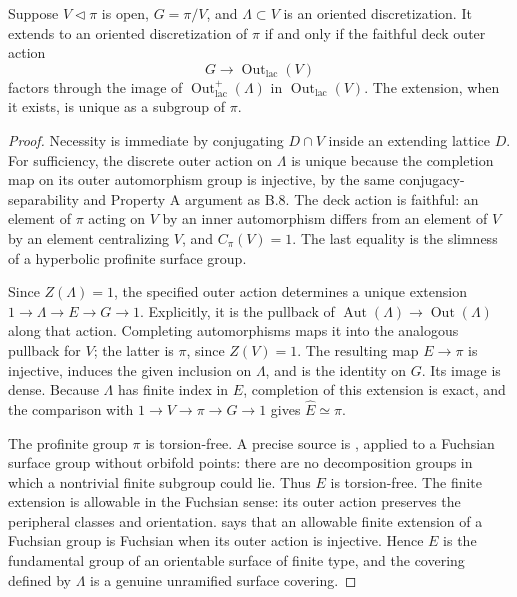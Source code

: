 Suppose $V\triangleleft\pi$ is open, $G=\pi/V$, and
$\Lambda\subset V$ is an oriented discretization.  It extends to an
oriented discretization of $\pi$ if and only if the faithful deck
outer action
\[
 G\longrightarrow\operatorname{Out}_{\mathrm{lac}}(V)
\]
factors through the image of
$\operatorname{Out}_{\mathrm{lac}}^+(\Lambda)$ in
$\operatorname{Out}_{\mathrm{lac}}(V)$.  The extension, when it
exists, is unique as a subgroup of $\pi$.

\begin{proof}
Necessity is immediate by conjugating $D\cap V$ inside an extending
lattice $D$.  For sufficiency, the discrete outer action on $\Lambda$
is unique because the completion map on its outer automorphism group
is injective, by the same conjugacy-separability and Property A
argument as B.8.  The deck action is faithful: an element of $\pi$
acting on $V$ by an inner automorphism differs from an element of
$V$ by an element centralizing $V$, and $C_\pi(V)=1$.  The last
equality is the slimness of a hyperbolic profinite surface group.

Since $Z(\Lambda)=1$, the specified outer action determines a unique
extension $1\to\Lambda\to E\to G\to1$.  Explicitly, it is the
pullback of $\operatorname{Aut}(\Lambda)\to
\operatorname{Out}(\Lambda)$ along that action.  Completing
automorphisms maps it into the analogous pullback for $V$; the
latter is $\pi$, since $Z(V)=1$.  The resulting map $E\to\pi$ is
injective, induces the given inclusion on $\Lambda$, and is the
identity on $G$.  Its image is dense.  Because $\Lambda$ has finite
index in $E$, completion of this extension is exact, and the
comparison with $1\to V\to\pi\to G\to1$ gives
$\widehat E\simeq\pi$.

The profinite group $\pi$ is torsion-free.  A precise source is
\citet[Lemma 3.1(ii)]{BoggiZalesskii2019BC}, applied to a Fuchsian
surface group without orbifold points: there are no decomposition
groups in which a nontrivial finite subgroup could lie.
Thus $E$ is torsion-free.  The finite extension is allowable in the
Fuchsian sense: its outer action preserves the peripheral classes
and orientation.  \citet[Theorem 7, p.~258]{Kerckhoff1983BC} says
that an allowable finite extension of a Fuchsian group is Fuchsian
when its outer action is injective.  Hence $E$ is the fundamental
group of an orientable surface of finite type, and the covering
defined by $\Lambda$ is a genuine unramified surface covering.


\end{proof}
